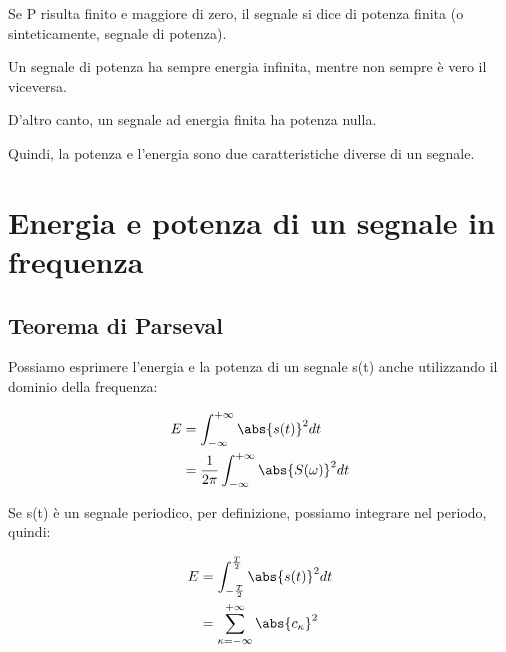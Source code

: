 Se P risulta finito e maggiore di zero, il segnale si dice di potenza finita 
(o sinteticamente, segnale di potenza). \newline 

Un segnale di potenza ha sempre energia infinita, mentre non sempre è vero il viceversa. \newline 

D'altro canto, un segnale ad energia finita ha potenza nulla. \newline 

Quindi, la potenza e l'energia sono due caratteristiche diverse di un segnale. \newline 

\newpage 

\section{Energia e potenza di un segnale in frequenza}

\subsection{Teorema di Parseval} 

Possiamo esprimere l'energia e la potenza di un segnale s(t) anche utilizzando 
il dominio della frequenza: 

{
    \Large 
    \begin{equation}
        \begin{split}
            E 
            &= 
            \int_{- \infty}^{+\infty} 
            \abs{s(t)} ^{2} dt 
            \\
            &= 
            \frac{1}{2 \pi} 
            \int_{- \infty}^{+\infty} 
            \abs{S(\omega)} ^{2} dt 
        \end{split}
    \end{equation}
}

Se s(t) è un segnale periodico, per definizione, possiamo integrare nel periodo, quindi: 

{
    \Large 
    \begin{equation}
     \begin{split}
        E 
        &= 
        \int_{- \frac{T}{2}}^{\frac{T}{2}} 
        \abs{s(t)} ^{2} dt 
        \\ 
        &= \sum_{\kappa = - \infty}^{+\infty}
        \abs{c_\kappa} ^{2} 
     \end{split}   
    \end{equation}
            
}

